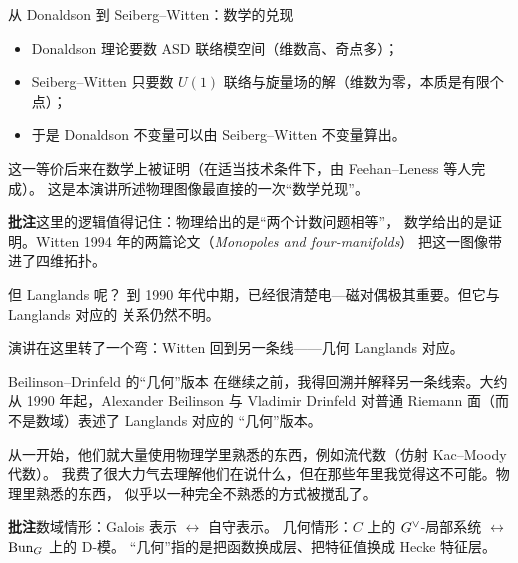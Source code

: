 \begin{frame}{从 Donaldson 到 Seiberg--Witten：数学的兑现}
  \begin{itemize}
    \item Donaldson 理论要数 ASD 联络模空间（维数高、奇点多）；
    \item Seiberg--Witten 只要数 $U(1)$ 联络与旋量场的解（维数为零，本质是有限个点）；
    \item 于是 Donaldson 不变量可以由 Seiberg--Witten 不变量算出。
  \end{itemize}
  \vspace{0.3em}
  这一等价后来在数学上被证明（在适当技术条件下，由 Feehan--Leness 等人完成）。
  这是本演讲所述物理图像最直接的一次“数学兑现”。
  \begin{beizhu}
  \textbf{批注}\quad 这里的逻辑值得记住：物理给出的是“两个计数问题相等”，
  数学给出的是证明。Witten 1994 年的两篇论文（\emph{Monopoles and four-manifolds}）
  把这一图像带进了四维拓扑。
  \end{beizhu}
\end{frame}

\begin{frame}{但 Langlands 呢？}
   到 1990 年代中期，已经很清楚电—磁对偶极其重要。但它与 Langlands 对应的
  关系仍然不明。
  \vspace{0.5em}

  演讲在这里转了一个弯：Witten 回到另一条线——几何 Langlands 对应。
  \begin{center}
  \end{center}
\end{frame}


\begin{frame}{Beilinson--Drinfeld 的“几何”版本}
   在继续之前，我得回溯并解释另一条线索。大约从 1990 年起，Alexander Beilinson
  与 Vladimir Drinfeld 对普通 Riemann 面（而不是数域）表述了 Langlands 对应的
  “几何”版本。
  \vspace{0.4em}

  从一开始，他们就大量使用物理学里熟悉的东西，例如流代数（仿射 Kac--Moody 代数）。
  我费了很大力气去理解他们在说什么，但在那些年里我觉得这不可能。物理里熟悉的东西，
  似乎以一种完全不熟悉的方式被搅乱了。
  \begin{beizhu}
  \textbf{批注}\quad 数域情形：Galois 表示 $\leftrightarrow$ 自守表示。
  几何情形：$C$ 上的 $G^{\vee}$-局部系统 $\leftrightarrow$ $\mathrm{Bun}_G$ 上的 D-模。
  “几何”指的是把函数换成层、把特征值换成 Hecke 特征层。
  \end{beizhu}
\end{frame}

